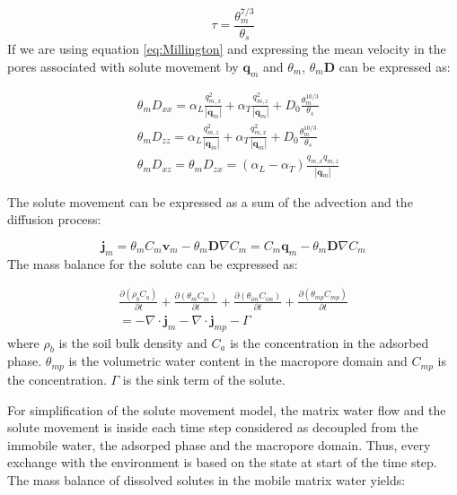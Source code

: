\documentclass{report}
\begin{document}
\begin{equation}
\tau=\frac{\theta_{m}^{7/3}}{\theta_s} \label{eq:Millington}
\end{equation}
%
If we are using equation \ref{eq:Millington} and expressing the mean
velocity in the pores associated with solute movement by
$\mathbf{q}_{m}$ and $\theta_{m}$, $\theta_{m}\mathbf{D}$ can be
expressed as:

\begin{equation}
\begin{split}
&\theta_{m}
D_{xx}=\alpha_L\frac{q_{m,x}^{2}}{|\mathbf{q}_m|}+\alpha_T\frac{q_{m,z}^{2}}
{|\mathbf{q}_{m}|}+D_0\frac{\theta_{m}^{10/3}}{\theta_s} \\
&\theta_{m}
D_{zz}=\alpha_L\frac{q_{m,z}^{2}}{|\mathbf{q}_{m}|}+\alpha_T\frac{q_{m,x}^{2}}
{|\mathbf{q}_{m}|}+D_0\frac{\theta_{m}^{10/3}}{\theta_s} \\
&\theta_{m} D_{xz}=\theta_{m}
  D_{zx}=(\alpha_L-\alpha_T)\frac{q_{m,x}q_{m,z}}{|\mathbf{q}_{m}|}
\end{split}
\end{equation}

The solute movement can be expressed as a sum of the advection and
the diffusion process:

\begin{equation}
\mathbf{j}_{m}=\theta_{m} C_{m}\mathbf{v}_{m}
-\theta_{m}\mathbf{D}\nabla C_{m}=C_{m}
\mathbf{q}_{m}-\theta_{m}\mathbf{D}\nabla C_{m}
\label{eq:heattransport}
\end{equation}
%
The mass balance for the solute
can be expressed as:

\begin{eqnarray}
\frac{\partial (\rho_b C_a)}{\partial t} + \frac{\partial
(\theta_{m}
  C_{m})}{\partial t} + \frac{\partial (\theta_{im}
  C_{im})}{\partial t} + \frac{\partial (\theta_{mp}
  C_{mp})}{\partial t} \nonumber \\ =-\nabla \cdot \mathbf{j}_{m}-\nabla
  \cdot \mathbf{j}_{mp} - \Gamma
\label{eq:heatenergybal_tot}
\end{eqnarray}
%
where $\rho_b$ is the soil bulk density and $C_a$ is the
concentration in the adsorbed phase. $\theta_{mp}$
is the volumetric water content in the macropore domain and $C_{mp}$
is the concentration. $\Gamma$ is the sink term of the solute.

For simplification of the solute movement model, the matrix water
flow and the solute movement is inside each time step considered as
decoupled from the immobile water, the adsorped phase and the
macropore domain. Thus, every exchange with the environment is based
on the state at start of the time step. The mass balance of
dissolved solutes in the mobile matrix water yields:
\end{document}
